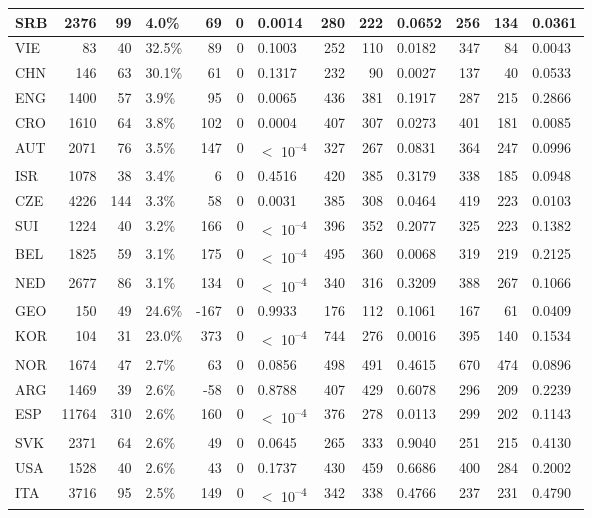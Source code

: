 \begin{tabular}{l|r|r|l|r|r|l|r|r|l|r|r|l}
\hline
SRB & 2376 & 99 & 4.0\% & 69 & 0 & 0.0014 & 280 & 222 & 0.0652 & 256 & 134 & 0.0361\\
\hline
VIE & 83 & 40 & 32.5\% & 89 & 0 & 0.1003 & 252 & 110 & 0.0182 & 347 & 84 & 0.0043\\
\hline
CHN & 146 & 63 & 30.1\% & 61 & 0 & 0.1317 & 232 & 90 & 0.0027 & 137 & 40 & 0.0533\\
\hline
ENG & 1400 & 57 & 3.9\% & 95 & 0 & 0.0065 & 436 & 381 & 0.1917 & 287 & 215 & 0.2866\\
\hline
CRO & 1610 & 64 & 3.8\% & 102 & 0 & 0.0004 & 407 & 307 & 0.0273 & 401 & 181 & 0.0085\\
\hline
AUT & 2071 & 76 & 3.5\% & 147 & 0 & $<$ 10\textsuperscript{--4} & 327 & 267 & 0.0831 & 364 & 247 & 0.0996\\
\hline
ISR & 1078 & 38 & 3.4\% & 6 & 0 & 0.4516 & 420 & 385 & 0.3179 & 338 & 185 & 0.0948\\
\hline
CZE & 4226 & 144 & 3.3\% & 58 & 0 & 0.0031 & 385 & 308 & 0.0464 & 419 & 223 & 0.0103\\
\hline
SUI & 1224 & 40 & 3.2\% & 166 & 0 & $<$ 10\textsuperscript{--4} & 396 & 352 & 0.2077 & 325 & 223 & 0.1382\\
\hline
BEL & 1825 & 59 & 3.1\% & 175 & 0 & $<$ 10\textsuperscript{--4} & 495 & 360 & 0.0068 & 319 & 219 & 0.2125\\
\hline
NED & 2677 & 86 & 3.1\% & 134 & 0 & $<$ 10\textsuperscript{--4} & 340 & 316 & 0.3209 & 388 & 267 & 0.1066\\
\hline
GEO & 150 & 49 & 24.6\% & -167 & 0 & 0.9933 & 176 & 112 & 0.1061 & 167 & 61 & 0.0409\\
\hline
KOR & 104 & 31 & 23.0\% & 373 & 0 & $<$ 10\textsuperscript{--4} & 744 & 276 & 0.0016 & 395 & 140 & 0.1534\\
\hline
NOR & 1674 & 47 & 2.7\% & 63 & 0 & 0.0856 & 498 & 491 & 0.4615 & 670 & 474 & 0.0896\\
\hline
ARG & 1469 & 39 & 2.6\% & -58 & 0 & 0.8788 & 407 & 429 & 0.6078 & 296 & 209 & 0.2239\\
\hline
ESP & 11764 & 310 & 2.6\% & 160 & 0 & $<$ 10\textsuperscript{--4} & 376 & 278 & 0.0113 & 299 & 202 & 0.1143\\
\hline
SVK & 2371 & 64 & 2.6\% & 49 & 0 & 0.0645 & 265 & 333 & 0.9040 & 251 & 215 & 0.4130\\
\hline
USA & 1528 & 40 & 2.6\% & 43 & 0 & 0.1737 & 430 & 459 & 0.6686 & 400 & 284 & 0.2002\\
\hline
ITA & 3716 & 95 & 2.5\% & 149 & 0 & $<$ 10\textsuperscript{--4} & 342 & 338 & 0.4766 & 237 & 231 & 0.4790\\

\end{tabular}

